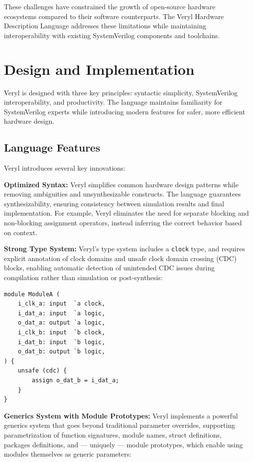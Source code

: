\documentclass[conference]{IEEEtran}
\begin{document}
These challenges have constrained the growth of open-source hardware ecosystems compared to their software counterparts. The Veryl Hardware Description Language addresses these limitations while maintaining interoperability with existing SystemVerilog components and toolchains.

\section{Design and Implementation}
Veryl is designed with three key principles: syntactic simplicity, SystemVerilog
interoperability, and productivity. The language
maintains familiarity for SystemVerilog experts while introducing modern
features for safer, more efficient hardware design.

\subsection{Language Features}
Veryl introduces several key innovations:

\textbf{Optimized Syntax:} Veryl simplifies common hardware design patterns
while removing ambiguities and unsynthesizable constructs. The language
guarantees synthesizability, ensuring consistency between simulation results and
final implementation. For example, Veryl eliminates the need for separate
blocking and non-blocking assignment operators, instead inferring the correct
behavior based on context.

\textbf{Strong Type System:} Veryl's type system includes a \texttt{clock} type,
and requires explicit annotation of clock domains and unsafe clock domain
crossing (CDC) blocks, enabling automatic detection of unintended CDC issues
during compilation rather than simulation or post-synthesis:

\begin{verbatim}
module ModuleA (
    i_clk_a: input  `a clock,
    i_dat_a: input  `a logic,
    o_dat_a: output `a logic,
    i_clk_b: input  `b clock,
    i_dat_b: input  `b logic,
    o_dat_b: output `b logic,
) {
    unsafe (cdc) {
        assign o_dat_b = i_dat_a;
    }
}
\end{verbatim}

\textbf{Generics System with Module Prototypes:} Veryl implements a powerful
generics system that goes beyond traditional parameter overrides, supporting
parametrization of function signatures, module names, struct definitions, packages definitions,
and --- uniquely --- module prototypes, which enable using modules themselves as generic
parameters:
\end{document}
